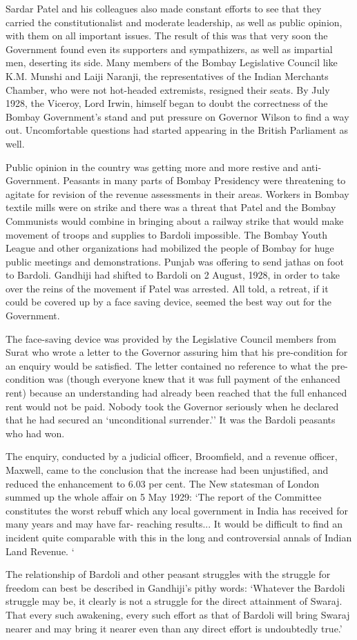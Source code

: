 Sardar Patel and his colleagues also made constant efforts to see that they carried the constitutionalist and moderate leadership, as well as public opinion, with them on all important issues. The result of this was that very soon the Government found even its supporters and sympathizers, as well as impartial men, deserting its side. Many members of the Bombay Legislative Council like K.M. Munshi and Laiji Naranji, the representatives of the Indian Merchants Chamber, who were not hot-headed extremists, resigned their seats. By July 1928, the Viceroy, Lord Irwin, himself began to doubt the correctness of the Bombay Government's stand and put pressure on Governor Wilson to find a way out. Uncomfortable questions had started appearing in the British Parliament as well.

Public opinion in the country was getting more and more restive and anti-Government. Peasants in many parts of Bombay Presidency were threatening to agitate for revision of the revenue assessments in their areas. Workers in Bombay textile mills were on strike and there was a threat that Patel and the Bombay Communists would combine in bringing about a railway strike that would make movement of troops and supplies to Bardoli impossible. The Bombay Youth League and other organizations had mobilized the people of Bombay for huge public meetings and demonstrations. Punjab was offering to send jathas on foot to Bardoli. Gandhiji had shifted to Bardoli on 2 August, 1928, in order to take over the reins of the movement if Patel was arrested. All told, a retreat, if it could be covered up by a face saving device, seemed the best way out for the Government.

The face-saving device was provided by the Legislative Council members from Surat who wrote a letter to the Governor assuring him that his pre-condition for an enquiry would be satisfied. The letter contained no reference to what the pre-condition was (though everyone knew that it was full payment of the enhanced rent) because an understanding had already been reached that the full enhanced rent would not be paid. Nobody took the Governor seriously when he declared that he had secured an `unconditional surrender.'' It was the Bardoli peasants who had won.

The enquiry, conducted by a judicial officer, Broomfield, and a revenue officer, Maxwell, came to the conclusion that the increase had been unjustified, and reduced the enhancement to 6.03 per cent. The New statesman of London summed up the whole affair on 5 May 1929: `The report of the Committee constitutes the worst rebuff which any local government in India has received for many years and may have far- reaching results... It would be difficult to find an incident quite comparable with this in the long and controversial annals of Indian Land Revenue. `

The relationship of Bardoli and other peasant struggles with the struggle for freedom can best be described in Gandhiji's pithy words: `Whatever the Bardoli struggle may be, it clearly is not a struggle for the direct attainment of Swaraj. That every such awakening, every such effort as that of Bardoli will bring Swaraj nearer and may bring it nearer even than any direct effort is undoubtedly true.'
